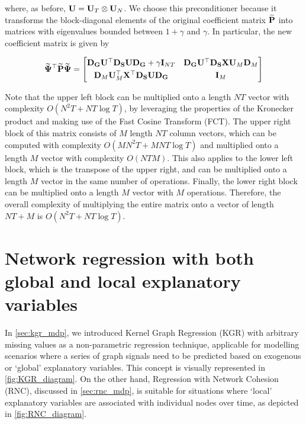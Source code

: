 where, as before, $\mathbf{U} = \mathbf{U}_T \otimes \mathbf{U}_N $. We choose this preconditioner because it transforms the block-diagonal elements of the original coefficient matrix $\widetilde{\mathbf{P}}$ into matrices with eigenvalues bounded between $1 + \gamma$ and $\gamma$. In particular, the new coefficient matrix is given by

\begin{equation*}
    \widetilde{\mathbf{\Psi}}^\top \widetilde{\mathbf{P}}  \widetilde{\mathbf{\Psi}} = 
       \begin{bmatrix}
        \mathbf{D}_{\mathbf{G}} \mathbf{U}^\top \mathbf{D}_{\mathbf{S}} \mathbf{U} \mathbf{D}_{\mathbf{G}} + \gamma \mathbf{I}_{NT}  &  \mathbf{D}_{\mathbf{G}} \mathbf{U}^\top \mathbf{D}_{\mathbf{S}} \mathbf{X} \mathbf{U}_M \mathbf{D}_M \\[0.1cm] 
        \mathbf{D}_M \mathbf{U}_M^\top \mathbf{X}^\top \mathbf{D}_{\mathbf{S}} \mathbf{U} \mathbf{D}_{\mathbf{G}} & \mathbf{I}_M
        \end{bmatrix}
\end{equation*}

Note that the upper left block can be multiplied onto a length $NT$ vector with complexity $O(N^2T + NT \log T)$, by leveraging the properties of the Kronecker product and making use of the Fast Cosine Transform (FCT). The upper right block of this matrix consists of $M$ length $NT$ column vectors, which can be computed with complexity $O(MN^2T + MNT \log T)$ and multiplied onto a length $M$ vector with complexity $O(NTM)$. This also applies to the lower left block, which is the transpose of the upper right, and can be multiplied onto a length $M$ vector in the same number of operations. Finally, the lower right block can be multiplied onto a length $M$ vector with $M$ operations. Therefore, the overall complexity of multiplying the entire matrix onto a vector of length $NT + M$ is $O(N^2T + NT \log T)$. 




\section{Network regression with both global and local explanatory variables}

\label{sec:kgrnc}

In \cref{sec:kgr_mdp}, we introduced Kernel Graph Regression (KGR) with arbitrary missing values as a non-parametric regression technique, applicable for modelling scenarios where a series of graph signals need to be predicted based on exogenous or `global' explanatory variables. This concept is visually represented in \cref{fig:KGR_diagram}. On the other hand, Regression with Network Cohesion (RNC), discussed in \cref{sec:rnc_mdp}, is suitable for situations where `local' explanatory variables are associated with individual nodes over time, as depicted in \cref{fig:RNC_diagram}.

